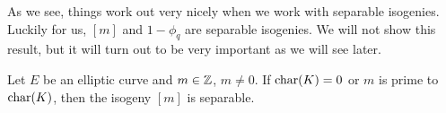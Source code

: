 As we see, things work out very nicely when we work with separable isogenies.
%
%
%
%
%	
%
Luckily for us, $[m]$ and $1 - \phi_q$ are separable isogenies. We will
not show this result, but it will turn out to be very important as we will see
later.


\begin{proposition}
	\label{prop:m-separable}
	Let $E$ be an elliptic curve and $m \in \mathbb{Z}$, $m \neq 0$.
	If $\operatorname{char}(K) = 0$ or $m$ is prime to $\operatorname{char}(K)$, then the
	isogeny $[m]$ is separable.
\end{proposition}

